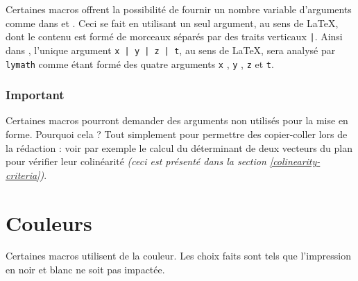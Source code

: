 \documentclass[12pt,a4paper]{article}
\begin{document}
Certaines macros offrent la possibilité de fournir un nombre variable d'arguments comme dans  et .
Ceci se fait en utilisant un seul argument, au sens de \LaTeX{}, dont le contenu est formé de morceaux séparés par des traits verticaux \verb+|+.
Ainsi dans , l'unique argument \verb+x | y | z | t+, au sens de \LaTeX{}, sera analysé par \verb+lymath+ comme étant formé des quatre arguments \verb+x+ , \verb+y+ , \verb+z+ et \verb+t+.




\subsubsection{Important}

Certaines macros pourront demander des arguments non utilisés pour la mise en forme. Pourquoi cela ? Tout simplement pour permettre des copier-coller lors de la rédaction : voir par exemple le calcul du déterminant de deux vecteurs du plan pour vérifier leur colinéarité \emph{(ceci est présenté dans la section \ref{colinearity-criteria})}.




\section{Couleurs}

Certaines macros utilisent de la couleur. Les choix faits sont tels que l'impression en noir et blanc ne soit pas impactée.
\end{document}
